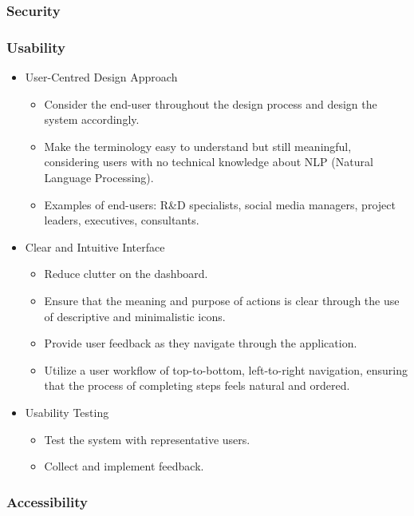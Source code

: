 \documentclass[12pt]{article}
\begin{document}
\subsubsection*{Security}

\subsubsection*{Usability}

\begin{itemize}
    \item User-Centred Design Approach
    \begin{itemize}
    \item Consider the end-user throughout the design process and design the system accordingly.
    \item Make the terminology easy to understand but still meaningful, considering users with no technical knowledge about NLP (Natural Language Processing).
    \item Examples of end-users: R\&D specialists, social media managers, project leaders, executives, consultants.
    \end{itemize}
    \item Clear and Intuitive Interface
    \begin{itemize}
    \item Reduce clutter on the dashboard.
    \item Ensure that the meaning and purpose of actions is clear through the use of descriptive and minimalistic icons.
    \item Provide user feedback as they navigate through the application.
    \item Utilize a user workflow of top-to-bottom, left-to-right navigation, ensuring that the process of completing steps feels natural and ordered.
    \end{itemize}
    \item Usability Testing
    \begin{itemize}
    \item Test the system with representative users.
    \item Collect and implement feedback.
    \end{itemize}
\end{itemize}

\subsubsection*{Accessibility}
\end{document}
